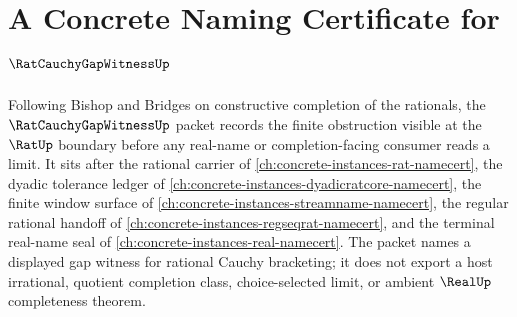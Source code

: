 \chapter{A Concrete Naming Certificate for $\RatCauchyGapWitnessUp$}
\label{ch:concrete-instances-rat-cauchy-gap-witness-namecert}

Following Bishop and Bridges on constructive completion of the rationals, the $\RatCauchyGapWitnessUp$ packet records the finite obstruction visible at the $\RatUp$ boundary before any real-name or completion-facing consumer reads a limit. It sits after the rational carrier of \autoref{ch:concrete-instances-rat-namecert}, the dyadic tolerance ledger of \autoref{ch:concrete-instances-dyadicratcore-namecert}, the finite window surface of \autoref{ch:concrete-instances-streamname-namecert}, the regular rational handoff of \autoref{ch:concrete-instances-regseqrat-namecert}, and the terminal real-name seal of \autoref{ch:concrete-instances-real-namecert}. The packet names a displayed gap witness for rational Cauchy bracketing; it does not export a host irrational, quotient completion class, choice-selected limit, or ambient $\RealUp$ completeness theorem.


